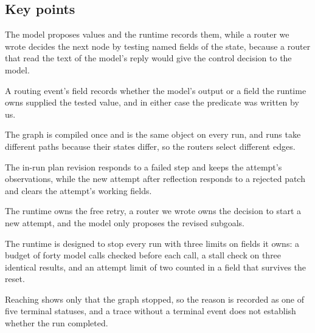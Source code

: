 \subsection*{Key points}
\bi
\item The model proposes values and the runtime records them, while a router we wrote decides the
next node by testing named fields of the state, because a router that read the text of the model's
reply would give the control decision to the model.
\item A routing event's  field records whether the model's output or a field the runtime
owns supplied the tested value, and in either case the predicate was written by us.
\item The graph is compiled once and is the same object on every run, and runs take different paths
because their states differ, so the routers select different edges.
\item The in-run plan revision responds to a failed step and keeps the attempt's observations, while
the new attempt after reflection responds to a rejected patch and clears the attempt's working
fields.
\item The runtime owns the free retry, a router we wrote owns the decision to start a new attempt,
and the model only proposes the revised subgoals.
\item The runtime is designed to stop every run with three limits on fields it owns: a budget of
forty model calls checked before each call, a stall check on three identical results, and an
attempt limit of two counted in a field that survives the reset.
\item Reaching  shows only that the graph stopped, so the reason is recorded as one of
five terminal statuses, and a trace without a terminal event does not establish whether the run
completed.
\ei
